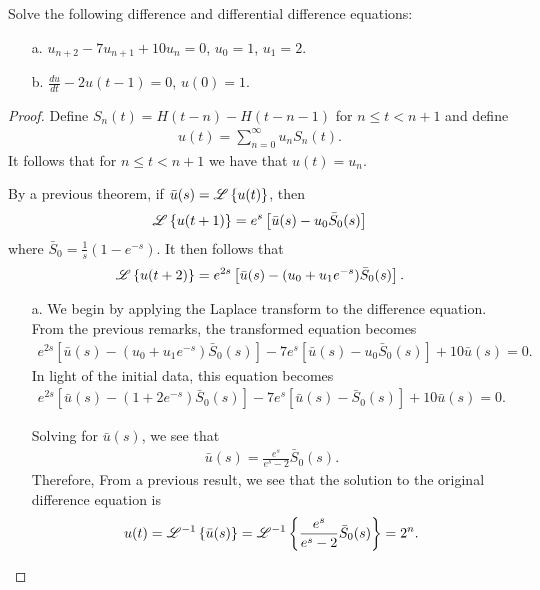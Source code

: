 \begin{problem}{7}
  Solve the following difference and differential difference equations:
  \begin{enumerate}
    \item[a.] $u_{n+2} - 7u_{n+1}+10 u_n = 0$, $u_0 = 1$, $u_1 = 2$.
    \item[b.] $\frac{du}{dt} - 2u(t-1) =0$, $u(0) = 1$.
  \end{enumerate}
\end{problem}

\begin{proof}
  Define $S_n(t) = H(t-n) - H(t-n-1)$ for $n \leq t < n+1$ and define
  \begin{align*}
    u(t) = \sum_{n=0}^\infty u_n S_n(t).
  \end{align*}
  It follows that for $n \leq t < n+1$ we have that $u(t) = u_n$.

  By a previous theorem, if $\bar{u}(s) = \mathscr{L}\left\{ {u(t)} \right\}$, then
  \begin{align*}
    \mathscr{L}\left\{ {u(t+1)} \right\} = e^s\left[\bar{u}(s)-u_0 \bar{S}_0(s)\right]
  \end{align*}
  where $\bar{S}_0 = \frac{1}{s}\left(1-e^{-s}\right)$. It then follows that
  \begin{align*}
    \mathscr{L}\left\{ {u(t+2)} \right\} = e^{2s}\left[\bar{u}(s)-(u_0 + u_1e^{-s})\bar{S}_0(s)\right].
  \end{align*}

  \begin{enumerate}
    \item[a.] We begin by applying the Laplace transform to the difference equation. From the previous remarks,
      the transformed equation becomes
      \begin{align*}
        e^{2s}\left[\bar{u}(s)-(u_0 + u_1e^{-s})\bar{S}_0(s)\right] -7e^s\left[\bar{u}(s)-u_0 \bar{S}_0(s)\right] + 10 \bar{u}(s) = 0.
      \end{align*}
      In light of the initial data, this equation becomes
      \begin{align*}
        e^{2s}\left[\bar{u}(s)-(1 + 2e^{-s})\bar{S}_0(s)\right] -7e^s\left[\bar{u}(s)- \bar{S}_0(s)\right] + 10 \bar{u}(s) = 0.
      \end{align*}

      Solving for $\bar{u}(s)$, we see that
      \begin{align*}
        \bar{u}(s) = \frac{e^s}{e^s-2}\bar{S}_0(s).
      \end{align*}
      Therefore, From a previous result, we see that the solution to the original difference equation is
      \begin{align*}
        u(t) = \mathscr{L}^{-1}\left\{ {\bar{u}(s)} \right\} = \mathscr{L}^{-1}\left\{ {\frac{e^s}{e^s-2}\bar{S}_0(s)} \right\} = 2^n.
      \end{align*}


\end{enumerate}
\end{proof}
